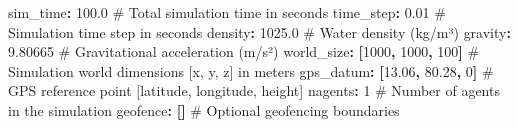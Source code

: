 \documentclass[
  letterpaper,
  DIV=11,
  numbers=noendperiod]{scrreprt}
\newenvironment{Shaded}{\begin{snugshade}}{\end{snugshade}}
\newcommand{\AttributeTok}[1]{\textcolor[rgb]{0.40,0.45,0.13}{#1}}
\newcommand{\CommentTok}[1]{\textcolor[rgb]{0.37,0.37,0.37}{#1}}
\newcommand{\DecValTok}[1]{\textcolor[rgb]{0.68,0.00,0.00}{#1}}
\newcommand{\FloatTok}[1]{\textcolor[rgb]{0.68,0.00,0.00}{#1}}
\newcommand{\FunctionTok}[1]{\textcolor[rgb]{0.28,0.35,0.67}{#1}}
\newcommand{\KeywordTok}[1]{\textcolor[rgb]{0.00,0.23,0.31}{\textbf{#1}}}
\begin{document}
\begin{Shaded}
\begin{Highlighting}[]
\FunctionTok{sim\_time}\KeywordTok{:}\AttributeTok{ }\FloatTok{100.0}\CommentTok{               \# Total simulation time in seconds}
\FunctionTok{time\_step}\KeywordTok{:}\AttributeTok{ }\FloatTok{0.01}\CommentTok{               \# Simulation time step in seconds}
\FunctionTok{density}\KeywordTok{:}\AttributeTok{ }\FloatTok{1025.0}\CommentTok{               \# Water density (kg/m³)}
\FunctionTok{gravity}\KeywordTok{:}\AttributeTok{ }\FloatTok{9.80665}\CommentTok{              \# Gravitational acceleration (m/s²)}
\FunctionTok{world\_size}\KeywordTok{:}\AttributeTok{ }\KeywordTok{[}\DecValTok{1000}\KeywordTok{,}\AttributeTok{ }\DecValTok{1000}\KeywordTok{,}\AttributeTok{ }\DecValTok{100}\KeywordTok{]}\CommentTok{ \# Simulation world dimensions [x, y, z] in meters}
\FunctionTok{gps\_datum}\KeywordTok{:}\AttributeTok{ }\KeywordTok{[}\FloatTok{13.06}\KeywordTok{,}\AttributeTok{ }\FloatTok{80.28}\KeywordTok{,}\AttributeTok{ }\DecValTok{0}\KeywordTok{]}\CommentTok{  \# GPS reference point [latitude, longitude, height]}
\FunctionTok{nagents}\KeywordTok{:}\AttributeTok{ }\DecValTok{1}\CommentTok{                    \# Number of agents in the simulation}
\FunctionTok{geofence}\KeywordTok{:}\AttributeTok{ }\KeywordTok{[]}\CommentTok{                  \# Optional geofencing boundaries}


\end{Highlighting}
\end{Shaded}
\end{document}
